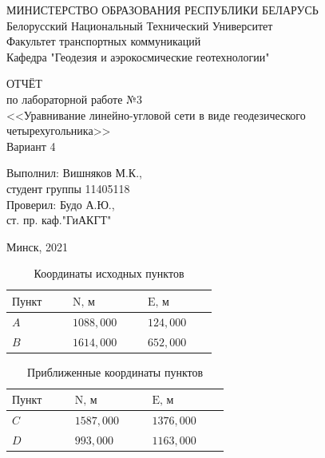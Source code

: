 \documentclass[a4paper]{article}
\begin{document}
\begin{titlepage}
\begin{center}
        \large{МИНИСТЕРСТВО ОБРАЗОВАНИЯ РЕСПУБЛИКИ БЕЛАРУСЬ\\
        Белорусский Национальный Технический Университет\\
        Факультет транспортных коммуникаций\\
        Кафедра "Геодезия и аэрокосмические геотехнологии"}
    \end{center}
    \begin{center}
        \vspace{13ex}
        \large{ОТЧЁТ\\
        по лабораторной работе №3\\
        <<Уравнивание линейно-угловой сети в виде геодезического четырехугольника>>\\
        Вариант 4}
    \end{center}
    \begin{flushright}
        \vspace{13ex}
        \large{Выполнил: Вишняков М.К.,\\
        студент группы 11405118\\
        \vspace{5ex}
        Проверил: Будо А.Ю.,\\
        ст. пр. каф."ГиАКГТ"\\}
    \end{flushright}
    \begin{center}
        \vfill
        \large{Минск, 2021}
    \end{center}
\end{titlepage}
\newpage

\begin{table}[h]
    \caption{Координаты исходных пунктов}
    \centering\begin{tabular}{|p{0.17\linewidth}|p{0.17\linewidth}|p{0.17\linewidth}|}
    \hline
         $\text{Пункт}$ & $\text{N, м}$ & $\text{E, м}$\\
         \hline
         $A$ & $1088,000$ & $124,000$ \\
         \hline
         $B$ & $1614,000$ & $652,000$ \\
         \hline
    \end{tabular}
\end{table}
\begin{table}[h]
    \caption{Приближенные координаты пунктов}
    \centering\begin{tabular}{|p{0.18\linewidth}|p{0.18\linewidth}|p{0.18\linewidth}|}
    \hline
         $\text{Пункт}$ & $\text{N, м}$ & $\text{E, м}$\\
         \hline
         $C$ & $1587,000$ & $1376,000$ \\
         \hline
         $D$ & $993,000$ & $1163,000$ \\
         \hline
    \end{tabular}
\end{table}
\end{document}
